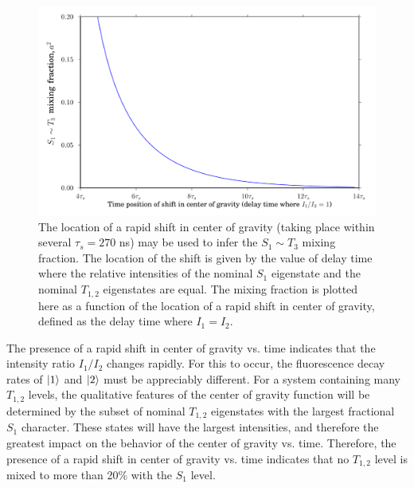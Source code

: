 \begin{figure}
  \caption{The location of a rapid shift in center of gravity (taking
    place within several $\tau_s = 270$ ns) may be used to infer the
    $S_1 \sim T_3$ mixing fraction.  The location of the shift is
    given by the value of delay time where the relative intensities of
    the nominal $S_1$ eigenstate and the nominal $T_{1,2}$ eigenstates
    are equal.  The mixing fraction is plotted here as a function of
    the location of a rapid shift in center of gravity, defined as the
    delay time where $I_1 = I_2$.}
  \label{fig:cog-inflection-point}

  \centering
  \includegraphics[width=6in]{cog-inflection-point.pdf}
\end{figure}

The presence of a rapid shift in center of gravity vs. time indicates
that the intensity ratio $I_1/I_2$ changes rapidly.  For this to
occur, the fluorescence decay rates of $\mathinner{|{1}\rangle}$ and $\mathinner{|{2}\rangle}$ must be
appreciably different.  For a system containing many $T_{1,2}$ levels,
the qualitative features of the center of gravity function will be
determined by the subset of nominal $T_{1,2}$ eigenstates with the
largest fractional $S_1$ character.  These states will have the
largest intensities, and therefore the greatest impact on the
behavior of the center of gravity vs. time.  Therefore, the presence
of a rapid shift in center of gravity vs. time indicates that no
$T_{1,2}$ level is mixed to more than 20\% with the $S_1$ level.

